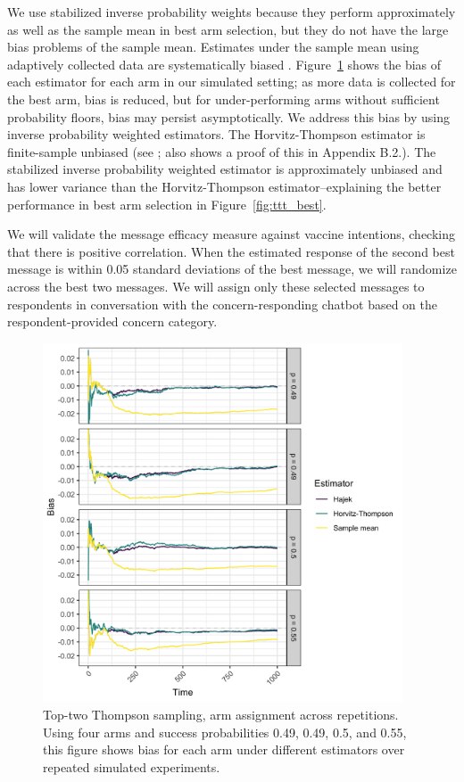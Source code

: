 \documentclass[letterpaper, 12pt, parskip=full,DIV=10]{scrartcl}
\begin{document}
We use stabilized inverse probability weights because they perform approximately as well as the sample mean in best arm selection, but they do not have the large bias problems of the sample mean. Estimates under the sample mean using adaptively collected data are systematically biased \citep{nie2017adaptively}.  Figure~\ref{fig:ttt_bias} shows the bias of each estimator for each arm in our simulated setting; as more data is collected for the best arm, bias is reduced, but for under-performing arms without sufficient probability floors, bias may persist asymptotically. We address this bias by using inverse probability weighted estimators. The Horvitz-Thompson estimator is finite-sample unbiased (see \citealt{bowden2017unbiased}; \citealt{offer2021adaptive} also shows a proof of this in Appendix B.2.). The stabilized inverse probability weighted estimator is approximately unbiased and has lower variance than the Horvitz-Thompson estimator--explaining the better performance in best arm selection in Figure~\ref{fig:ttt_best}. 

We will validate the message efficacy measure against vaccine intentions, checking that there is positive correlation. When the estimated response of the second best message is within 0.05 standard deviations of the best message, we will randomize across the best two messages. We will assign only these selected messages to respondents in conversation with the concern-responding chatbot based on the respondent-provided concern category. 


\begin{figure}[htbp]
   \centering
   \includegraphics[width = 0.95\textwidth]{../../tables-figures/tt_bias4.png}
   \caption{Top-two Thompson sampling, arm assignment across repetitions. Using four arms and success probabilities 0.49, 0.49, 0.5, and 0.55, this figure shows bias for each arm under different estimators over repeated simulated experiments. }
   \label{fig:ttt_bias}
\end{figure}
\end{document}
